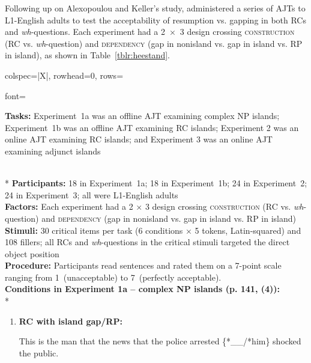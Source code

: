 Following up on Alexopoulou and Keller's study, \textcite{heestand.etal2011} administered a series of AJTs to L1-English adults to test the acceptability of resumption vs. gapping in both RCs and \textit{wh}-questions. Each experiment had a 2~×~3 design crossing \textsc{construction} (RC vs. \textit{wh}-question) and \textsc{dependency} (gap in nonisland vs. gap in island vs. RP in island), as shown in Table~\ref{tblr:heestand}.

\begin{longtblr}[caption={\textcite{heestand.etal2011}: Acceptability judgment tasks}, label={tblr:heestand}]{colspec={|X|}, rowhead=0, rows={font=\raggedright{}}}\hline
\textbf{Tasks:} Experiment~1a was an offline AJT examining complex NP islands; Experiment~1b was an offline AJT examining RC islands; Experiment 2 was an online AJT examining RC islands; and Experiment 3 was an online AJT examining adjunct islands \vspace{5pt}\rule{0pt}{10pt}\\*
\textbf{Participants:} 18 in Experiment~1a; 18 in Experiment~1b; 24 in Experiment~2; 24 in Experiment~3; all were L1-English adults \vspace{5pt}\\
\textbf{Factors:} Each experiment had a 2 × 3 design crossing \textsc{construction} (RC vs. \textit{wh}-question) and \textsc{dependency} (gap in nonisland vs. gap in island vs. RP in island) \vspace{5pt}\\
\textbf{Stimuli:} 30 critical items per task (6 conditions × 5 tokens, Latin-squared) and 108 fillers; all RCs and \textit{wh}-questions in the critical stimuli targeted the direct object position \vspace{5pt}\\
\textbf{Procedure:} Participants read sentences and rated them on a 7-point scale ranging from 1~(unacceptable) to 7~(perfectly acceptable). \vspace{5pt}\\
\textbf{Conditions in Experiment 1a -- complex NP islands (p. 141, (4)):} \vspace{5pt}\\*
\begin{varwidth}{\linewidth}\begin{enumerate}[\bfseries (a),itemsep=5pt] 
\item \textbf{RC with island gap/RP:}\par\nobreak
This is the man that the news that the police arrested \{*\_\_/*him\} shocked the public.

\end{enumerate}
\end{varwidth}
\end{longtblr}

